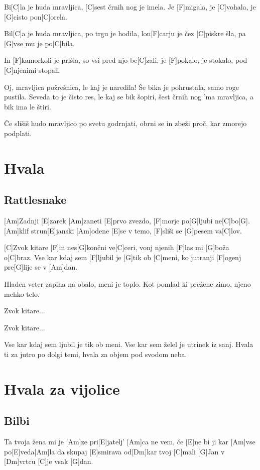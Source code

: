 \documentclass[a4paper,12pt]{article}
\begin{document}
\begin{multicols}{2}
\begin{guitar}
Bi[C]la je huda mravljica, 
[C]sest črnih nog je imela.
Je [F]migala, je [C]vohala, je [G]cisto pon[C]orela.


Bil[C]a je huda mravljica, po trgu je hodila,
lon[F]carju je čez [C]piskre šla,
pa [G]vse mu je po[C]bila.


In [F]kamorkoli je prišla,
so vsi pred njo be[C]zali,
je [F]pokalo, je stokalo, pod [G]njenimi stopali.


Oj, mravljica požrešnica, le kaj je naredila!
Še bika je pohrustala, samo roge pustila.
Seveda to je čisto res, le kaj se bik šopiri,
šest črnih nog 'ma mravljica, 
a bik ima le štiri.


Če slišiš hudo mravljico po svetu godrnjati,
obrni se in zbeži proč, kar zmorejo podplati.

\end{guitar}
\section{Hvala}
\subsection*{Rattlesnake}
\begin{guitar}
[Am Am7 F Am Am7 F#m]

[Am]Zadnji [E]zarek [Am]zaneti [E]prvo zvezdo,
[F]morje po[G]ljubi ne[C]bo[G].
[Am]klif strun[E]janski [Am]odene [E]se v temo,
[F]sliši se [G]pesem va[C]lov.


[C]Zvok kitare [F]in nes[G]končni ve[C]ceri,
vonj njenih [F]las mi [G]boža o[C]braz.
Vse kar kdaj sem [F]ljubil je [G]tik ob [C]meni,
ko jutranji [F]ogenj pre[G]lije se v [Am]dan.
     
            
Hladen veter zapiha na obalo,
meni je toplo.
Kot pomlad ki prežene zimo,
njeno mehko telo.

Zvok kitare...

Zvok kitare...

Vse kar kdaj sem ljubil je tik ob meni.
Vse kar sem želel je utrinek iz sanj.
Hvala ti za jutro po dolgi temi,
hvala za objem pod svodom neba.

\end{guitar}
\section{Hvala za vijolice}
\subsection*{Bilbi}
\begin{guitar}
[E]Ta tvoja žena mi je [Am]ze pri[E]jatelj' [Am]ca 
ne vem, če [E]ne bi ji kar [Am]vse po[E]veda[Am]la 
da skupaj [E]smirava od[Dm]kar tvoj [C]mali [G]Jan 
v [Dm]vrtcu [C]je vsak [G]dan. 



\end{guitar}
\end{multicols}
\end{document}

